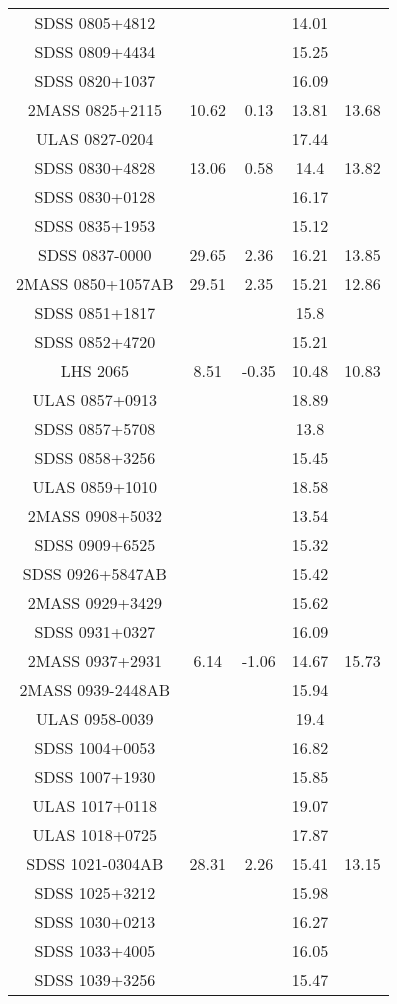 \begin{table}
\begin{tabular}{ccccc}
SDSS 0805+4812 &  &  & 14.01 &  \\
SDSS 0809+4434 &  &  & 15.25 &  \\
SDSS 0820+1037 &  &  & 16.09 &  \\
2MASS 0825+2115 & 10.62 & 0.13 & 13.81 & 13.68 \\
ULAS 0827-0204 &  &  & 17.44 &  \\
SDSS 0830+4828 & 13.06 & 0.58 & 14.4 & 13.82 \\
SDSS 0830+0128 &  &  & 16.17 &  \\
SDSS 0835+1953 &  &  & 15.12 &  \\
SDSS 0837-0000 & 29.65 & 2.36 & 16.21 & 13.85 \\
2MASS 0850+1057AB & 29.51 & 2.35 & 15.21 & 12.86 \\
SDSS 0851+1817 &  &  & 15.8 &  \\
SDSS 0852+4720 &  &  & 15.21 &  \\
LHS 2065 & 8.51 & -0.35 & 10.48 & 10.83 \\
ULAS 0857+0913 &  &  & 18.89 &  \\
SDSS 0857+5708 &  &  & 13.8 &  \\
SDSS 0858+3256 &  &  & 15.45 &  \\
ULAS 0859+1010 &  &  & 18.58 &  \\
2MASS 0908+5032 &  &  & 13.54 &  \\
SDSS 0909+6525 &  &  & 15.32 &  \\
SDSS 0926+5847AB &  &  & 15.42 &  \\
2MASS 0929+3429 &  &  & 15.62 &  \\
SDSS 0931+0327 &  &  & 16.09 &  \\
2MASS 0937+2931 & 6.14 & -1.06 & 14.67 & 15.73 \\
2MASS 0939-2448AB &  &  & 15.94 &  \\
ULAS 0958-0039 &  &  & 19.4 &  \\
SDSS 1004+0053 &  &  & 16.82 &  \\
SDSS 1007+1930 &  &  & 15.85 &  \\
ULAS 1017+0118 &  &  & 19.07 &  \\
ULAS 1018+0725 &  &  & 17.87 &  \\
SDSS 1021-0304AB & 28.31 & 2.26 & 15.41 & 13.15 \\
SDSS 1025+3212 &  &  & 15.98 &  \\
SDSS 1030+0213 &  &  & 16.27 &  \\
SDSS 1033+4005 &  &  & 16.05 &  \\
SDSS 1039+3256 &  &  & 15.47 &  \\

\end{tabular}
\end{table}
